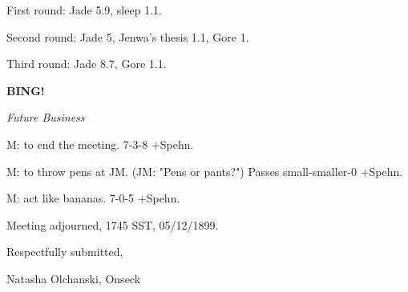 \documentclass[12pt]{article}
\newcommand{\bing}{{\bf BING!} }
\newcommand{\goto}[1]{\bing \vskip 12pt \centerline{{\em{#1}}}}
\begin{document}
First round: Jade 5.9, sleep 1.1.

Second round: Jade 5, Jenwa's thesis 1.1, Gore 1.

Third round: Jade 8.7, Gore 1.1.

\goto{Future Business}

M: to end the meeting. 7-3-8 +Spehn.

M: to throw pens at JM. (JM: "Pens or pants?") Passes small-smaller-0 +Spehn.

M: act like bananas. 7-0-5 +Spehn.

\vspace{12pt}

\noindent
Meeting adjourned, 1745 SST, 05/12/1899.

\vspace{18pt}

\centerline{Respectfully submitted,}
\centerline{Natasha Olchanski, Onseck}
\end{document}
